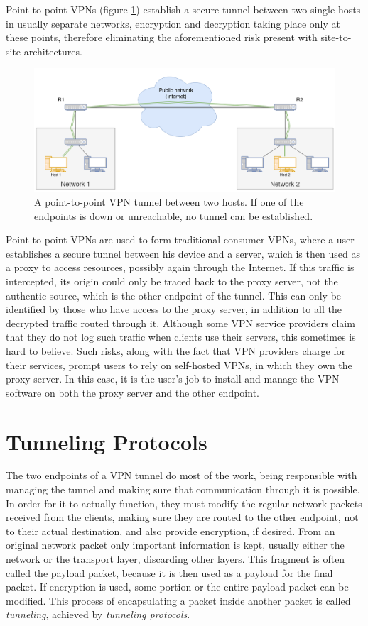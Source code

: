 \documentclass[a4paper,12pt]{report}
\begin{document}
		Point-to-point VPNs (figure \ref{fig:point-to-point_VPN}) establish a secure tunnel between two single hosts in usually separate networks, encryption and decryption taking place only at these points, therefore eliminating the aforementioned risk present with site-to-site architectures.
		\begin{figure}[h]
			\includegraphics[width=\textwidth]{point-to-point_VPN}
			\centering
			\caption{A point-to-point VPN tunnel between two hosts. If one of the endpoints is down or unreachable, no tunnel can be established.}
			\label{fig:point-to-point_VPN}
		\end{figure}
		
		Point-to-point VPNs are used to form traditional consumer VPNs, where a user establishes a secure tunnel between his device and a server, which is then used as a proxy to access resources, possibly again through the Internet. If this traffic is intercepted, its origin could only be traced back to the proxy server, not the authentic source, which is the other endpoint of the tunnel. This can only be identified by those who have access to the proxy server, in addition to all the decrypted traffic routed through it. Although some VPN service providers claim that they do not log such traffic when clients use their servers, this sometimes is hard to believe. Such risks, along with the fact that VPN providers charge for their services, prompt users to rely on self-hosted VPNs, in which they own the proxy server. In this case, it is the user's job to install and manage the VPN software on both the proxy server and the other endpoint.
		
		\section{Tunneling Protocols}
		The two endpoints of a VPN tunnel do most of the work, being responsible with managing the tunnel and making sure that communication through it is possible. In order for it to actually function, they must modify the regular network packets received from the clients, making sure they are routed to the other endpoint, not to their actual destination, and also provide encryption, if desired. From an original network packet only important information is kept, usually either the network or the transport layer, discarding other layers. This fragment is often called the payload packet, because it is then used as a payload for the final packet. If encryption is used, some portion or the entire payload packet can be modified. This process of encapsulating a packet inside another packet is called \textit{tunneling}, achieved by \textit{tunneling protocols}.
		
\end{document}
